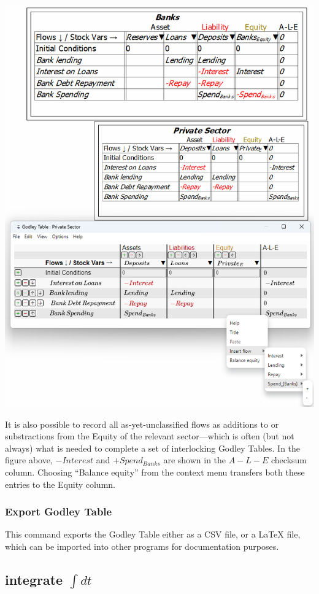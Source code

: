 \includegraphics[width=15cm]{images/GodleyTableContextMenu}

It is also possible to record all as-yet-unclassified flows as additions
to or substractions from the Equity of the relevant sector---which
is often (but not always) what is needed to complete a set of interlocking
Godley Tables. In the figure above, $-Interest$ and $+Spend_{Banks}$
are shown in the $A-L-E$ checksum column. Choosing ``Balance equity''
from the context menu transfers both these entries to the Equity column.

\subsubsection{Export Godley Table}

This command exports the Godley Table either as a CSV file, or a LaTeX
file, which can be imported into other programs for documentation
purposes.

\subsection{integrate $\int dt$}

